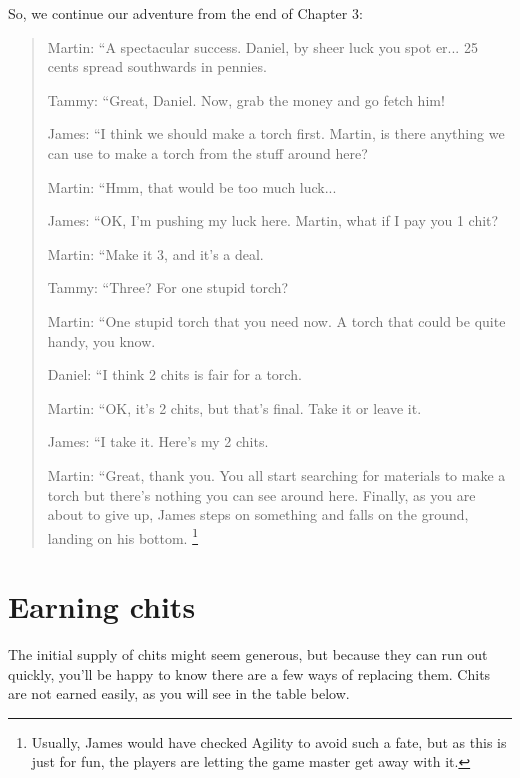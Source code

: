 So, we continue our adventure from the end of Chapter 3:
\begin{verse}
Martin: ``A spectacular success. Daniel, by sheer luck you spot er...
25 cents spread southwards in pennies.\textquotedbl{}

Tammy: ``Great, Daniel. Now, grab the money and go fetch him!\textquotedbl{}

James: ``I think we should make a torch first. Martin, is there anything
we can use to make a torch from the stuff around here?\textquotedbl{}

Martin: ``Hmm, that would be too much luck...\textquotedbl{}

James: ``OK, I'm pushing my luck here. Martin, what if I pay you
1 chit?\textquotedbl{}

Martin: ``Make it 3, and it's a deal.\textquotedbl{}

Tammy: ``Three? For one stupid torch?\textquotedbl{}

Martin: ``One stupid torch that you need now. A torch that could
be quite handy, you know.\textquotedbl{}

Daniel: ``I think 2 chits is fair for a torch.\textquotedbl{}

Martin: ``OK, it's 2 chits, but that's final. Take it or leave it.\textquotedbl{}

James: ``I take it. Here's my 2 chits.\textquotedbl{}

Martin: ``Great, thank you. You all start searching for materials
to make a torch but there's nothing you can see around here. Finally,
as you are about to give up, James steps on something and falls on
the ground, landing on his bottom.%
\footnote{Usually, James would have checked Agility to avoid such a fate, but
as this is just for fun, the players are letting the game master get
away with it.%
}
\end{verse}

\section{Earning chits}

The initial supply of chits might seem generous, but because they
can run out quickly, you'll be happy to know there are a few ways
of replacing them. Chits are not earned easily, as you will see in
the table below.

\begin{center}
\label{sub:Earning Chits Table}
\par\end{center}

